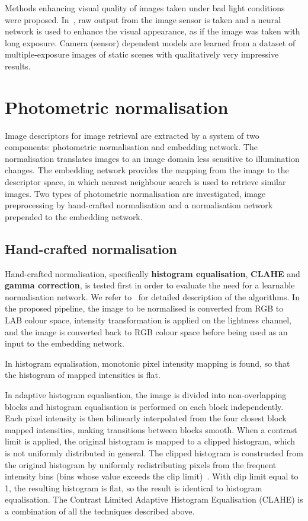 Methods enhancing visual quality of images taken under bad light conditions were proposed. In~\cite{Chen-CVPR18}, raw output from the image sensor is taken and a neural network is used to enhance the visual appearance, as if the image was taken with long exposure. Camera (sensor) dependent models are learned from a dataset of multiple-exposure images of static scenes with qualitatively very impressive results.


\section{Photometric normalisation}

Image descriptors for image retrieval are extracted by a system of two components: photometric normalisation and embedding network. The normalisation translates images to an image domain less sensitive to illumination changes. The embedding network provides the mapping from the image to the descriptor space, in which  nearest neighbour search is used to retrieve similar images.
Two types of photometric normalisation are investigated, image preprocessing by hand-crafted normalisation and a normalisation network prepended to the embedding network.
 
\subsection{Hand-crafted normalisation}

Hand-crafted normalisation, specifically {\bf histogram equalisation}, {\bf CLAHE} and {\bf gamma correction}, is tested first in order to evaluate the need for a learnable normalisation network. We refer to~\cite{szeliski2010computer} for detailed  description of the algorithms. In the proposed pipeline, the image to be normalised is converted from RGB to LAB colour space, intensity transformation is applied on the lightness channel, and the image is converted back to RGB colour space before being used as an input to the embedding network.

In histogram equalisation, monotonic pixel intensity mapping is found, so that the histogram of mapped intensities is flat. 

In adaptive histogram equalisation, the image is divided into non-overlapping blocks and histogram equalisation is performed on each block independently. Each pixel intensity is then bilinearly interpolated from the four closest block mapped intensities, making transitions between blocks smooth. 
When a contrast limit is applied, the original histogram is mapped to a clipped histogram, which is not uniformly distributed in general.
The clipped histogram is constructed from the original histogram by uniformly redistributing pixels from the frequent intensity bins (bins whose value exceeds the clip limit)~\cite{szeliski2010computer}.
With clip limit equal to 1, the resulting histogram is flat, so the result is identical to histogram equalisation. The Contrast Limited Adaptive Histogram Equalisation (CLAHE) is a combination of all the techniques described above.

